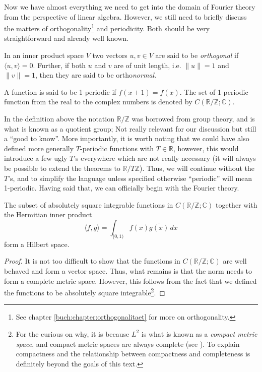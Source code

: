 Now we have almost everything we need to get into the domain of Fourier theory
from the perspective of linear algebra. However, we still need to briefly
discuss the matters of orthogonality\footnote{See chapter
\ref{buch:chapter:orthogonalitaet} for more on orthogonality.} and
periodicity. Both should be very straightforward and already well known.

\begin{definition}
  \label{kugel:def:orthogonality}
  In an inner product space \(V\) two vectors \(u, v \in V\) are said to be
  \emph{orthogonal} if \(\langle u, v \rangle = 0\). Further, if both \(u\)
  and \(v\) are of unit length, i.e. \(\| u \| = 1\) and \(\| v \| = 1\), then
  they are said to be ortho\emph{normal}.
\end{definition}

\begin{definition}
  A function is said to be 1-periodic if \(f(x + 1) = f(x)\). The set of
  1-periodic function from the real to the complex
  numbers is denoted by \(C(\mathbb{R}/\mathbb{Z}; \mathbb{C})\).
\end{definition}

In the definition above the notation \(\mathbb{R}/\mathbb{Z}\) was borrowed
from group theory, and is what is known as a quotient group; Not really
relevant for our discussion but still a ``good to know''. More importantly, it
is worth noting that we could have also defined more generally \(T\)-periodic
functions with \(T\in\mathbb{R}\), however, this would introduce a few ugly
\(T\)'s everywhere which are not really necessary (it will always be possible
to extend the theorems to \(\mathbb{R} / T\mathbb{Z}\)). Thus, we will
continue without the \(T\)'s, and to simplify the language unless specified
otherwise ``periodic'' will mean 1-periodic. Having said that, we can
officially begin with the Fourier theory.

\begin{lemma}
  \label{kugel:thm:sqint-hilbert}
  The subset of absolutely square integrable functions in
  \(C(\mathbb{R}/\mathbb{Z}; \mathbb{C})\) together with the Hermitian inner
  product
  \[
    \langle f, g \rangle = \int_{[0, 1)} f(x) \overline{g(x)} \, dx
  \]
  form a Hilbert space.
\end{lemma}
\begin{proof}
  It is not too difficult to show that the functions in \(C(\mathbb{R} /
  \mathbb{Z}; \mathbb{C})\) are well behaved and form a vector space. Thus,
  what remains is that the norm needs to form a complete metric space.
  However, this follows from the fact that we defined the functions to be
  absolutely square integrable\footnote{For the curious on why, it is because
  \(L^2\) is what is known as a \emph{compact metric space}, and compact
  metric spaces are always complete (see \cite{eck_metric_2022,
  tao_analysis_2016}). To explain compactness and the relationship between
  compactness and completeness is definitely beyond the goals of this text.}.
\end{proof}

